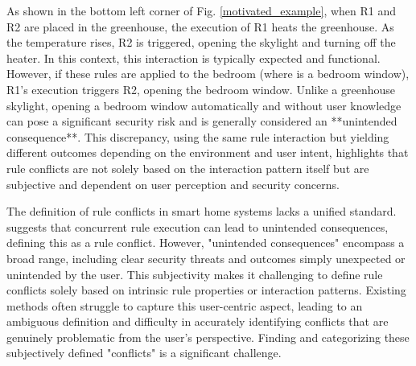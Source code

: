 As shown in the bottom left corner of Fig. \ref{motivated_example}, when R1 and R2 are placed in the greenhouse, the execution of R1 heats the greenhouse. As the temperature rises, R2 is triggered, opening the skylight and turning off the heater. In this context, this interaction is typically expected and functional. However, if these rules are applied to the bedroom (where  is a bedroom window), R1's execution triggers R2, opening the bedroom window. Unlike a greenhouse skylight, opening a bedroom window automatically and without user knowledge can pose a significant security risk and is generally considered an **unintended consequence**. This discrepancy, using the same rule interaction but yielding different outcomes depending on the environment and user intent, highlights that rule conflicts are not solely based on the interaction pattern itself but are subjective and dependent on user perception and security concerns.

The definition of rule conflicts in smart home systems lacks a unified standard. \cite{huang2023survey} suggests that concurrent rule execution can lead to unintended consequences, defining this as a rule conflict. However, "unintended consequences" encompass a broad range, including clear security threats and outcomes simply unexpected or unintended by the user. This subjectivity makes it challenging to define rule conflicts solely based on intrinsic rule properties or interaction patterns. Existing methods often struggle to capture this user-centric aspect, leading to an ambiguous definition and difficulty in accurately identifying conflicts that are genuinely problematic from the user's perspective. Finding and categorizing these subjectively defined "conflicts" is a significant challenge.

